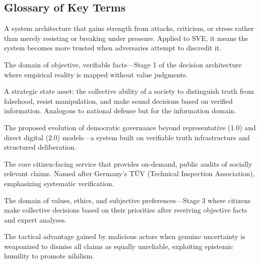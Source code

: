 \documentclass[11pt,a4paper]{article}
\begin{document}
\begin{small}
\section*{Glossary of Key Terms}

\begin{description}[style=nextline, leftmargin=0pt, labelindent=0pt, font=\normalfont\bfseries]
    \item[Antifragile Design] A system architecture that gains strength from attacks, criticism, or stress rather than merely resisting or breaking under pressure. Applied to SVE, it means the system becomes more trusted when adversaries attempt to discredit it.
    
    \item[Caesar's Realm] The domain of objective, verifiable facts—Stage 1 of the decision architecture where empirical reality is mapped without value judgments.
    
    \item[Cognitive Security] A strategic state asset: the collective ability of a society to distinguish truth from falsehood, resist manipulation, and make sound decisions based on verified information. Analogous to national defense but for the information domain.
    
    \item[Democracy 3.0] The proposed evolution of democratic governance beyond representative (1.0) and direct digital (2.0) models—a system built on verifiable truth infrastructure and structured deliberation.
    
    \item[Fakten-TÜV (Fact-Inspection Agency)] The core citizen-facing service that provides on-demand, public audits of socially relevant claims. Named after Germany's TÜV (Technical Inspection Association), emphasizing systematic verification.
    
    \item[God's Realm] The domain of values, ethics, and subjective preferences—Stage 3 where citizens make collective decisions based on their priorities after receiving objective facts and expert analyses.
    
    \item[Liar's Dividend] The tactical advantage gained by malicious actors when genuine uncertainty is weaponized to dismiss all claims as equally unreliable, exploiting epistemic humility to promote nihilism.
    

\end{description}
\end{small}
\end{document}

